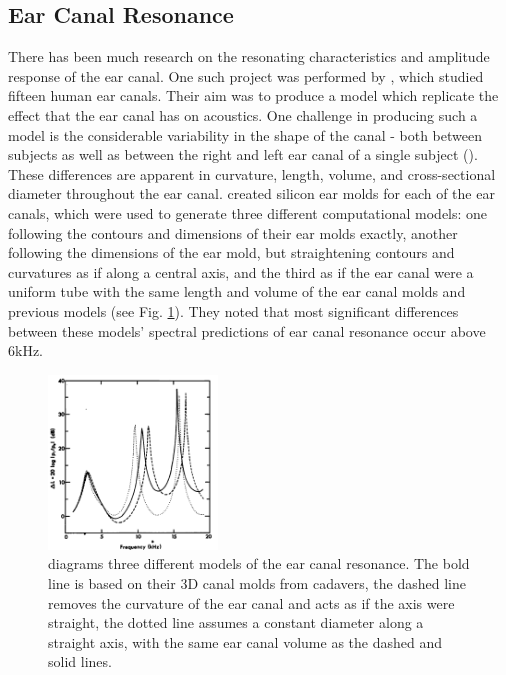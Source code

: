 \subsection{Ear Canal Resonance}
There has been much research on the resonating characteristics and amplitude response of the ear canal.  One such project was performed by \cite{stinson:89}, which studied fifteen human ear canals.  Their aim was to produce a model which \DIFdelbegin {}\DIFdelend \DIFaddbegin {}\DIFaddend replicate the effect that the ear canal has on acoustics.
One challenge in producing such a model is the considerable variability in the shape of the canal - both between subjects as well as between the right and left ear canal of a single subject (\cite{stinson:89}).  These differences are apparent in curvature, length, volume, and cross-sectional diameter throughout the ear canal.  \cite{stinson:89} created silicon ear molds for each of the ear canals, which were used to generate three different computational models: one following the contours and dimensions of their ear molds exactly, another following the dimensions of the ear mold, but straightening contours and curvatures as if along a central axis, and the third as if the ear canal were a uniform tube with the same length and volume of the ear canal molds and previous models (see Fig. \ref{fig:eac_modelling}).  They noted that most significant differences between these models' spectral predictions of ear canal resonance occur above 6kHz.
\DIFaddbegin 

\DIFaddend %
\DIFdelbegin %
\DIFdelend \DIFaddbegin \begin{figure}[h!]
\DIFaddendFL \centering
  \includegraphics[width=0.4\textwidth]{figure/eac_mod_diffs.png}
  \caption{\cite{stinson:89} diagrams three different models of the ear canal resonance.  The bold line is based on their 3D canal molds from cadavers, the dashed line removes the curvature of the ear canal and acts as if the axis were straight, the dotted line assumes a constant diameter along a straight axis, with the same ear canal volume as the dashed and solid lines.}
  \label{fig:eac_modelling}
\DIFdelbeginFL %
\DIFdelendFL %
\DIFaddbeginFL \end{figure}
\DIFaddend %
\DIFaddbegin 

